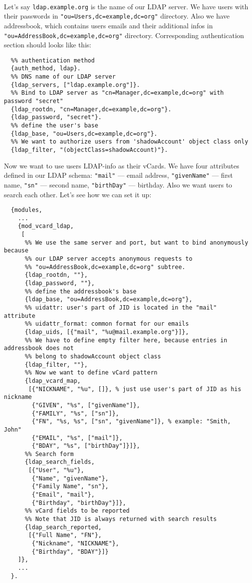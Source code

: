 \documentclass[a4paper,10pt]{book}
\newcommand{\term}[1]{\texttt{#1}}
\begin{document}
\paragraph{}

Let's say \term{ldap.example.org} is the name of our LDAP server. We have
users with their passwords in \term{"ou=Users,dc=example,dc=org"} directory.
Also we have addressbook, which contains users emails and their additional
infos in \term{"ou=AddressBook,dc=example,dc=org"} directory.  Corresponding
authentication section should looks like this:

\begin{verbatim}
  %% authentication method
  {auth_method, ldap}.
  %% DNS name of our LDAP server
  {ldap_servers, ["ldap.example.org"]}.
  %% Bind to LDAP server as "cn=Manager,dc=example,dc=org" with password "secret"
  {ldap_rootdn, "cn=Manager,dc=example,dc=org"}.
  {ldap_password, "secret"}.
  %% define the user's base
  {ldap_base, "ou=Users,dc=example,dc=org"}.
  %% We want to authorize users from 'shadowAccount' object class only
  {ldap_filter, "(objectClass=shadowAccount)"}.
\end{verbatim}

Now we want to use users LDAP-info as their vCards.  We have four attributes
defined in our LDAP schema: \term{"mail"} --- email address, \term{"givenName"}
--- first name, \term{"sn"} --- second name, \term{"birthDay"} --- birthday.
Also we want users to search each other.  Let's see how we can set it up:

\begin{verbatim}
  {modules,
    ...
    {mod_vcard_ldap,
     [
      %% We use the same server and port, but want to bind anonymously because
      %% our LDAP server accepts anonymous requests to
      %% "ou=AddressBook,dc=example,dc=org" subtree.
      {ldap_rootdn, ""},
      {ldap_password, ""},
      %% define the addressbook's base
      {ldap_base, "ou=AddressBook,dc=example,dc=org"},
      %% uidattr: user's part of JID is located in the "mail" attribute
      %% uidattr_format: common format for our emails
      {ldap_uids, [{"mail", "%u@mail.example.org"}]},
      %% We have to define empty filter here, because entries in addressbook does not
      %% belong to shadowAccount object class
      {ldap_filter, ""},
      %% Now we want to define vCard pattern
      {ldap_vcard_map,
       [{"NICKNAME", "%u", []}, % just use user's part of JID as his nickname
        {"GIVEN", "%s", ["givenName"]},
        {"FAMILY", "%s", ["sn"]},
        {"FN", "%s, %s", ["sn", "givenName"]}, % example: "Smith, John"
        {"EMAIL", "%s", ["mail"]},
        {"BDAY", "%s", ["birthDay"]}]},
      %% Search form
      {ldap_search_fields,
       [{"User", "%u"},
        {"Name", "givenName"},
        {"Family Name", "sn"},
        {"Email", "mail"},
        {"Birthday", "birthDay"}]},
      %% vCard fields to be reported
      %% Note that JID is always returned with search results
      {ldap_search_reported,
       [{"Full Name", "FN"},
        {"Nickname", "NICKNAME"},
        {"Birthday", "BDAY"}]}
    ]},
    ...
  }.
\end{verbatim}
\end{document}
